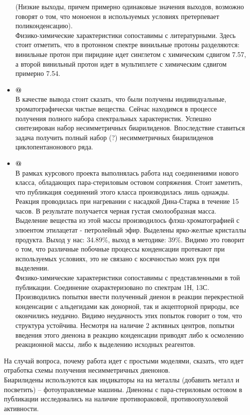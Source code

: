 \documentclass[a4paper]{article}
\makeatletter
\newcommand*{\rom}[1]{\expandafter\@slowromancap\romannumeral #1@}
\makeatother
\begin{document}
\begin{itemize}
(Низкие выходы, причем примерно одинаковые значения выходов, возможно говорят о том, что моноенон в используемых условиях претерпевает поликонденсацию). \\
Физико-химические характеристики сопоставимы с литературными.
Здесь стоит отметить, что в протонном спектре винильные протоны разделяются: винильные протон при  пиридине идет синглетом с химическим сдвигом 7.57, а второй винильный протон идет в мультиплете с химическим сдвигом примерно 7.54.
\item \textbf{\rom{4}} \\
В качестве вывода стоит сказать, что были получены индивидуальные, хроматографически чистые вещества. Сейчас находимся в процессе получения полного набора спектральных характеристик.
Успешно синтезирован набор несимметричных биарилиденов. Впоследствие ставиться задача получить полный набор (?) несимметричных биарилиденов циклопентанонового ряда.
\item \textbf{\rom{5}} \\
В рамках курсового проекта выполнялась работа над соединениями нового класса, обладающих пара-стериловым остовом сопряжения. Стоит заметить, что публикация соединений этого класса производилась лишь однажды. 
Реакция проводилась при нагревании с насадкой Дина-Старка в течение 15 часов. В результате получается черная густая смолообразная масса. Выделение вещества из этой массы производилось флэш-хроматографией с элюентом этилацетат - петролейный эфир. Выделены ярко-желтые кристаллы продукта. Выход у нас: 34.89\%, выход в методике: 39\%. Видимо это говорит о том, что различные побочные процессы конденсации протекают при используемых условиях, это не связано с косячностью моих рук при выделении. \\ 
Физико-химические характеристики сопоставимы с представленными в той публикации. Соединение охарактеризовано по спектрам 1Н, 13С. 
Производились попытки ввести полученный диенон в реакции перекрестной конденсации с альдегидами как донорной, так и акцепторной природы, все окончились неудачно. Видимо неудачность этих попыток говорит о том, что структура устойчива. Несмотря на наличие 2 активных центров, попытки введения этого диенона в реакцию конденсации приводят либо к осмолению реакционной массы, либо к выделению исходных реагентов. 
\end{itemize}

На случай вопроса, почему работа идет с простыми моделями, сказать, что идет отработка схемы получения несимметричных диенонов.\\
Биарилидены используются как индикаторы на на металлы (добавить металл и посветить) -- фотоуправляемые машины. 
Диеноны с пара-стериловым остовом в публикации исследовались на наличие противораковой, противоопухолевой активности.
\end{document}
